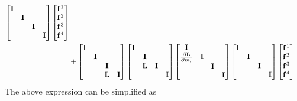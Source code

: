 \documentclass[revised,endfloat]{geophysics}
\begin{document}
\begin{equation}
\begin{split}
\begin{bmatrix}
{\bf I} & & & \\
& {\bf I} & & \\
 & &  {\bf I}& \\
 & & & {\bf I} \\
\end {bmatrix}
\begin{bmatrix}
{\bf f}^1 \\
{\bf f}^2 \\
{\bf f}^3 \\
{\bf f}^4 \\
\end{bmatrix}                 \\
&+ \begin{bmatrix}
{\bf I} & & & \\
 & {\bf I} & & \\
 & &  {\bf I}& \\
 & & {\bf L}& {\bf I} \\
\end {bmatrix}
\begin{bmatrix}
{\bf I} & & & \\
 & {\bf I} & & \\
 & {\bf L} &  {\bf I}& \\
 & & & {\bf I} \\
\end {bmatrix}
\begin{bmatrix}
{\bf I} & & & \\
\frac{\partial {\bf L}}{\partial m_l} & {\bf I} & & \\
 & &  {\bf I}& \\
 & & & {\bf I} \\
\end {bmatrix}
\begin{bmatrix}
{\bf I} & & & \\
& {\bf I} & & \\
 & &  {\bf I}& \\
 & & & {\bf I} \\
\end {bmatrix}
\begin{bmatrix}
{\bf f}^1 \\
{\bf f}^2 \\
{\bf f}^3 \\
{\bf f}^4 \\
\end{bmatrix} \\
\end{split}
\label{eq54}
\end{equation}
The above expression can be simplified as 
\end{document}
